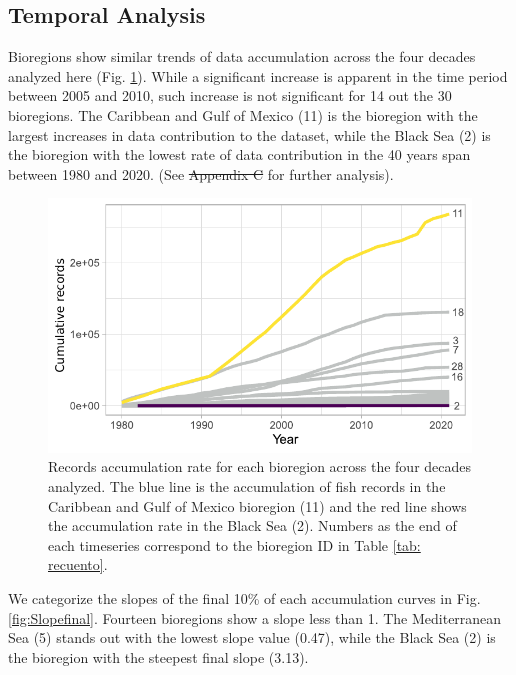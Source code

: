 \documentclass[12pt,authoryear]{elsarticle}
\providecommand{\DIFaddtex}[1]{{\protect\color{blue}\uwave{#1}}} %
\providecommand{\DIFdeltex}[1]{{\protect\color{red}\sout{#1}}}                      %
\providecommand{\DIFaddbegin}{} %
\providecommand{\DIFaddend}{} %
\providecommand{\DIFdelbegin}{} %
\providecommand{\DIFdelend}{} %
\providecommand{\DIFadd}[1]{\texorpdfstring{\DIFaddtex{#1}}{#1}} %
\providecommand{\DIFdel}[1]{\texorpdfstring{\DIFdeltex{#1}}{}} %
\begin{document}
\subsection{Temporal Analysis}
\label{sec:temporal-analysis}
Bioregions show similar trends of data accumulation across the four decades analyzed here (Fig. \ref{fig:record-accumlation}). While a significant increase is apparent in the time period between 2005 and 2010, such increase is not significant for 14 out the 30 bioregions. The Caribbean and Gulf of Mexico (11) is the bioregion with the largest increases in data contribution to the dataset, while the Black Sea (2) is the bioregion with the lowest rate of data contribution in the 40 years span between 1980 and 2020. (See \DIFdelbegin \DIFdel{Appendix C }\DIFdelend \DIFaddbegin \DIFadd{\ref{sec:bioregions-slopes} }\DIFaddend for further analysis).

\begin{figure}[h]
  \centering
  \includegraphics[width=.8\textwidth]{Fig_3}
  \caption{Records accumulation rate for each bioregion across the four decades analyzed. The blue line is the  accumulation of fish records  in the Caribbean and Gulf of Mexico bioregion (11) and the red line shows the accumulation rate in the Black Sea (2). Numbers as the end of each timeseries correspond to the bioregion ID in Table \ref{tab: recuento}.}
  \label{fig:record-accumlation}
\end{figure}

We categorize the slopes of the final 10\% of each accumulation curves  in Fig. \ref{fig:Slopefinal}. Fourteen bioregions show a slope less than 1. The Mediterranean Sea (5) stands out with the lowest slope value (0.47), while the Black Sea (2) is the bioregion with the steepest final slope (3.13). 
\end{document}
